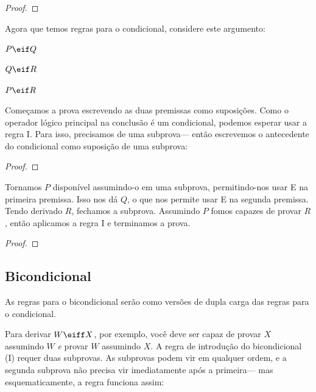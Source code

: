 \begin{proof}
	 
\end{proof}

Agora que temos regras para o condicional, considere este argumento:
\label{proofHS}
\begin{earg}
\item[] $P \eif Q$
\item[] $Q \eif R$
\item[\therefore] $P \eif R$
\end{earg}
Começamos a prova escrevendo as duas premissas como suposições. Como o operador lógico principal na conclusão é um condicional, podemos esperar usar a regra {\eif}I. Para isso, precisamos de uma subprova--- então escrevemos o antecedente do condicional como suposição de uma subprova:

\begin{proof}
	\open
	\close
\end{proof}

Tornamos $P$ disponível assumindo-o em uma subprova, permitindo-nos usar {\eif}E na primeira premissa. Isso nos dá $Q$, o que nos permite usar {\eif}E na segunda premissa. Tendo derivado $R$, fechamos a subprova. Assumindo $P$ fomos capazes de provar $R$, então aplicamos a regra {\eif}I e terminamos a prova.

\label{HSproof}
\begin{proof}
	\open
	\close
\end{proof}





\subsection{Bicondicional}
As regras para o bicondicional serão como versões de dupla carga das regras para o condicional.

Para derivar $W \eiff X$, por exemplo, você deve ser capaz de provar $X$ assumindo $W$ \emph{e} provar $W$ assumindo $X$. A regra de introdução do bicondicional ({\eiff}I) requer duas subprovas. As subprovas podem vir em qualquer ordem, e a segunda subprova não precisa vir imediatamente após a primeira--- mas esquematicamente, a regra funciona assim:


